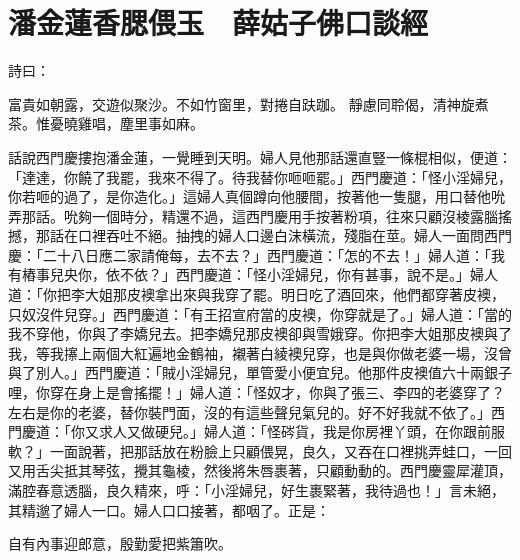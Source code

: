 %

\chapter{潘金蓮香腮偎玉　薛姑子佛口談經}

詩曰：

富貴如朝露，交遊似聚沙。不如竹窗里，對捲自趺跏。
靜慮同聆偈，清神旋煮茶。惟憂曉雞唱，塵里事如麻。

話說西門慶摟抱潘金蓮，一覺睡到天明。婦人見他那話還直豎一條棍相似，便道：「達達，你饒了我罷，我來不得了。待我替你咂咂罷。」西門慶道：「怪小淫婦兒，你若咂的過了，是你造化。」這婦人真個蹲向他腰間，按著他一隻腿，用口替他吮弄那話。吮夠一個時分，精還不過，這西門慶用手按著粉項，往來只顧沒棱露腦搖撼，那話在口裡吞吐不絕。抽拽的婦人口邊白沫橫流，殘脂在莖。婦人一面問西門慶：「二十八日應二家請俺每，去不去？」西門慶道：「怎的不去！」婦人道：「我有樁事兒央你，依不依？」西門慶道：「怪小淫婦兒，你有甚事，說不是。」婦人道：「你把李大姐那皮襖拿出來與我穿了罷。明日吃了酒回來，他們都穿著皮襖，只奴沒件兒穿。」西門慶道：「有王招宣府當的皮襖，你穿就是了。」婦人道：「當的我不穿他，你與了李嬌兒去。把李嬌兒那皮襖卻與雪娥穿。你把李大姐那皮襖與了我，等我㩟上兩個大紅遍地金鶴袖，襯著白綾襖兒穿，也是與你做老婆一場，沒曾與了別人。」西門慶道：「賊小淫婦兒，單管愛小便宜兒。他那件皮襖值六十兩銀子哩，你穿在身上是會搖擺！」婦人道：「怪奴才，你與了張三、李四的老婆穿了？左右是你的老婆，替你裝門面，沒的有這些聲兒氣兒的。好不好我就不依了。」西門慶道：「你又求人又做硬兒。」婦人道：「怪硶貨，我是你房裡丫頭，在你跟前服軟？」一面說著，把那話放在粉臉上只顧偎晃，良久，又吞在口裡挑弄蛙口，一回又用舌尖抵其琴弦，攪其龜棱，然後將朱唇裹著，只顧動動的。西門慶靈犀灌頂，滿腔春意透腦，良久精來，呼：「小淫婦兒，好生裹緊著，我待過也！」言未絕，其精邈了婦人一口。婦人口口接著，都咽了。正是：

自有內事迎郎意，殷勤愛把紫簫吹。

